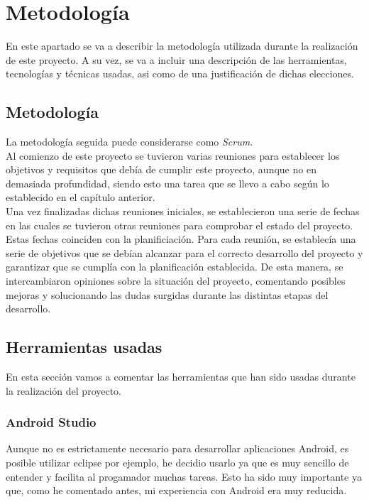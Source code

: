 \chapter{Metodología}
\label{cap:metodologia}

En este apartado se va a describir la metodología utilizada durante la realización de este proyecto. A su vez, se va a incluir una descripción de las herramientas, tecnologías y técnicas usadas, asi como de una justificación de dichas elecciones.

\section{Metodología}

La metodología seguida puede considerarse como \textit{Scrum}.\\

Al comienzo de este proyecto se tuvieron varias reuniones para establecer los objetivos y requisitos que debía de cumplir este proyecto, aunque no en demasiada profundidad, siendo esto una tarea que se llevo a cabo según lo establecido en el capítulo anterior.\\

Una vez finalizadas dichas reuniones iniciales, se establecieron una serie de fechas en las cuales se tuvieron otras reuniones para comprobar el estado del proyecto. Estas fechas coinciden con la planificiación. Para cada reunión, se establecía una serie de objetivos que se debían alcanzar para el correcto desarrollo del proyecto y garantizar que se cumplía con la planificación establecida. De esta manera, se intercambiaron opiniones sobre la situación del proyecto, comentando posibles mejoras y solucionando las dudas surgidas durante las distintas etapas del desarrollo.\\

\section{Herramientas usadas}

En esta sección vamos a comentar las herramientas que han sido usadas durante la realización del proyecto.

\subsection{Android Studio}

Aunque no es estrictamente necesario para desarrollar aplicaciones Android, es posible utilizar eclipse por ejemplo, he decidio usarlo ya que es muy sencillo de entender y facilita al progamador muchas tareas. Esto ha sido muy importante ya que, como he comentado antes, mi experiencia con Android era muy reducida.\\

